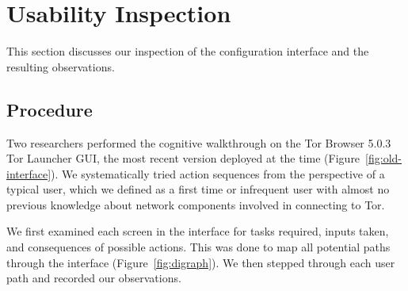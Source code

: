 \documentclass[USenglish,oneside,twocolumn]{article}
\begin{document}
\section{Usability Inspection}
\label{sec:inspection}
This section discusses our inspection of the configuration interface and the resulting observations.

\subsection{Procedure} 
Two researchers performed the cognitive walkthrough on the Tor Browser 5.0.3 Tor Launcher GUI, the most recent version deployed at the time (Figure~\ref{fig:old-interface}). We systematically tried action sequences from the perspective of a typical user, which we defined as a first time or infrequent user with almost no previous knowledge about network components involved in connecting to Tor.

We first examined each screen in the interface for tasks required, inputs taken, and consequences of possible actions. This was done to map all potential paths through the interface (Figure~\ref{fig:digraph}). We then stepped through each user path and recorded our observations. 
\end{document}
